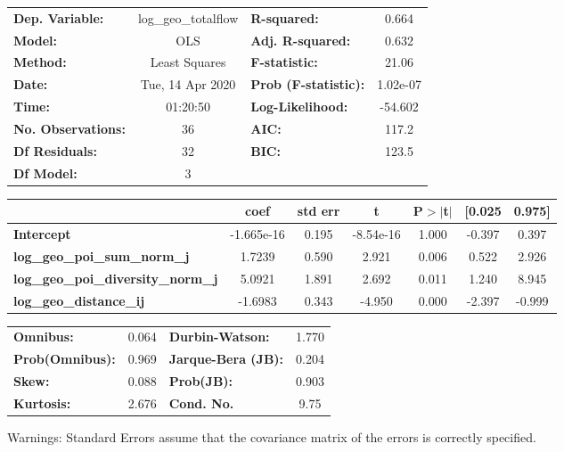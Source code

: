 \begin{center}
\begin{tabular}{lclc}
\toprule
\textbf{Dep. Variable:}                    & log\_geo\_totalflow & \textbf{  R-squared:         } &     0.664   \\
\textbf{Model:}                            &         OLS         & \textbf{  Adj. R-squared:    } &     0.632   \\
\textbf{Method:}                           &    Least Squares    & \textbf{  F-statistic:       } &     21.06   \\
\textbf{Date:}                             &   Tue, 14 Apr 2020  & \textbf{  Prob (F-statistic):} &  1.02e-07   \\
\textbf{Time:}                             &       01:20:50      & \textbf{  Log-Likelihood:    } &   -54.602   \\
\textbf{No. Observations:}                 &            36       & \textbf{  AIC:               } &     117.2   \\
\textbf{Df Residuals:}                     &            32       & \textbf{  BIC:               } &     123.5   \\
\textbf{Df Model:}                         &             3       & \textbf{                     } &             \\
\bottomrule
\end{tabular}
\begin{tabular}{lcccccc}
                                           & \textbf{coef} & \textbf{std err} & \textbf{t} & \textbf{P$> |$t$|$} & \textbf{[0.025} & \textbf{0.975]}  \\
\midrule
\textbf{Intercept}                         &   -1.665e-16  &        0.195     & -8.54e-16  &         1.000        &       -0.397    &        0.397     \\
\textbf{log\_geo\_poi\_sum\_norm\_j}       &       1.7239  &        0.590     &     2.921  &         0.006        &        0.522    &        2.926     \\
\textbf{log\_geo\_poi\_diversity\_norm\_j} &       5.0921  &        1.891     &     2.692  &         0.011        &        1.240    &        8.945     \\
\textbf{log\_geo\_distance\_ij}            &      -1.6983  &        0.343     &    -4.950  &         0.000        &       -2.397    &       -0.999     \\
\bottomrule
\end{tabular}
\begin{tabular}{lclc}
\textbf{Omnibus:}       &  0.064 & \textbf{  Durbin-Watson:     } &    1.770  \\
\textbf{Prob(Omnibus):} &  0.969 & \textbf{  Jarque-Bera (JB):  } &    0.204  \\
\textbf{Skew:}          &  0.088 & \textbf{  Prob(JB):          } &    0.903  \\
\textbf{Kurtosis:}      &  2.676 & \textbf{  Cond. No.          } &     9.75  \\
\bottomrule
\end{tabular}
\end{center}

Warnings: \newline
 [1] Standard Errors assume that the covariance matrix of the errors is correctly specified.